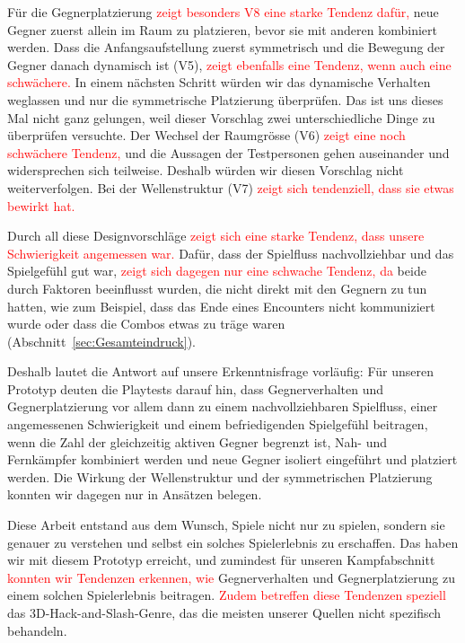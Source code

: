 \documentclass[../Main.tex]{subfiles}
\begin{document}
Für die Gegnerplatzierung \textcolor{red}{zeigt besonders V8 eine starke Tendenz dafür,} neue Gegner zuerst allein im Raum zu platzieren, bevor sie mit anderen kombiniert werden. Dass die Anfangsaufstellung zuerst symmetrisch und die Bewegung der Gegner danach dynamisch ist (V5), \textcolor{red}{zeigt ebenfalls eine Tendenz, wenn auch eine schwächere.} In einem nächsten Schritt würden wir das dynamische Verhalten weglassen und nur die symmetrische Platzierung überprüfen. Das ist uns dieses Mal nicht ganz gelungen, weil dieser Vorschlag zwei unterschiedliche Dinge zu überprüfen versuchte. Der Wechsel der Raumgrösse (V6) \textcolor{red}{zeigt eine noch schwächere Tendenz,} und die Aussagen der Testpersonen gehen auseinander und widersprechen sich teilweise. Deshalb würden wir diesen Vorschlag nicht weiterverfolgen. Bei der Wellenstruktur (V7) \textcolor{red}{zeigt sich tendenziell, dass sie etwas bewirkt hat.}

Durch all diese Designvorschläge \textcolor{red}{zeigt sich eine starke Tendenz, dass unsere Schwierigkeit angemessen war.} Dafür, dass der Spielfluss nachvollziehbar und das Spielgefühl gut war, \textcolor{red}{zeigt sich dagegen nur eine schwache Tendenz, da} beide durch Faktoren beeinflusst wurden, die nicht direkt mit den Gegnern zu tun hatten, wie zum Beispiel, dass das Ende eines Encounters nicht kommuniziert wurde oder dass die Combos etwas zu träge waren (Abschnitt~\ref{sec:Gesamteindruck}).

Deshalb lautet die Antwort auf unsere Erkenntnisfrage vorläufig: Für unseren Prototyp deuten die Playtests darauf hin, dass Gegnerverhalten und Gegnerplatzierung vor allem dann zu einem nachvollziehbaren Spielfluss, einer angemessenen Schwierigkeit und einem befriedigenden Spielgefühl beitragen, wenn die Zahl der gleichzeitig aktiven Gegner begrenzt ist, Nah- und Fernkämpfer kombiniert werden und neue Gegner isoliert eingeführt und platziert werden. Die Wirkung der Wellenstruktur und der symmetrischen Platzierung konnten wir dagegen nur in Ansätzen belegen.

Diese Arbeit entstand aus dem Wunsch, Spiele nicht nur zu spielen, sondern sie genauer zu verstehen und selbst ein solches Spielerlebnis zu erschaffen. Das haben wir mit diesem Prototyp erreicht, und zumindest für unseren Kampfabschnitt \textcolor{red}{konnten wir Tendenzen erkennen, wie} Gegnerverhalten und Gegnerplatzierung zu einem solchen Spielerlebnis beitragen. \textcolor{red}{Zudem betreffen diese Tendenzen speziell} das 3D-Hack-and-Slash-Genre, das die meisten unserer Quellen nicht spezifisch behandeln.
\end{document}
